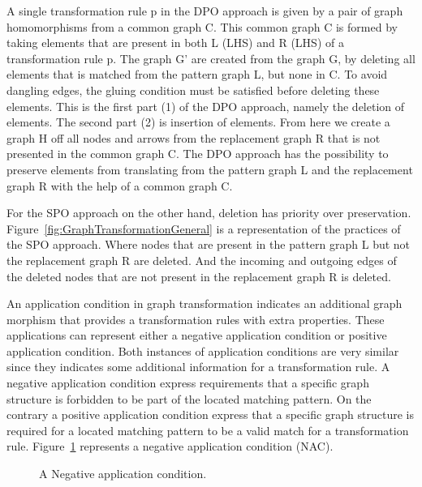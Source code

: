 A single transformation rule p in the DPO approach is given by a pair of graph
homomorphisms from a common graph C. This common graph C is formed by taking
elements that are present in both L (LHS) and R (LHS) of a transformation rule
p. The graph G' are created from the graph G, by deleting all elements that is
matched from the pattern graph L, but none in C. To avoid dangling edges,
the gluing condition must be satisfied before deleting these elements. This is
the first part (1) of the DPO approach, namely the deletion of elements. The
second part (2) is insertion of elements. From here we create a graph H off all
nodes and arrows from the replacement graph R that is not presented in the
common graph C. The DPO approach has the possibility to preserve elements from
translating from the pattern graph L and the replacement graph R with the help
of a common graph C.

For the SPO approach on the other hand, deletion has priority over preservation.
Figure~\ref{fig:GraphTransformationGeneral} is a representation of the practices
of the SPO approach. Where nodes that are present in the pattern graph L but not
the replacement graph R are deleted. And the incoming and outgoing edges of the
deleted nodes that are not present in the replacement graph R is deleted.

An application condition in graph transformation indicates an additional graph
morphism that provides a transformation rules with extra properties. These
applications can represent either a negative application condition or positive
application condition. Both instances of application conditions are very similar
since they indicates some additional information for a transformation rule. A
negative application condition express requirements that a specific graph
structure is forbidden to be part of the located matching pattern. On the
contrary a positive application condition express that a specific graph
structure is required for a located matching pattern to be a valid match for a
transformation rule. Figure~\ref{fig:NAC} represents a negative application
condition\cite{habel1996graph} (NAC).

\begin{figure}[H]
	\centering
	\caption[A Negative application condition]
	{A Negative application condition.}
	\label{fig:NAC}
\end{figure}

